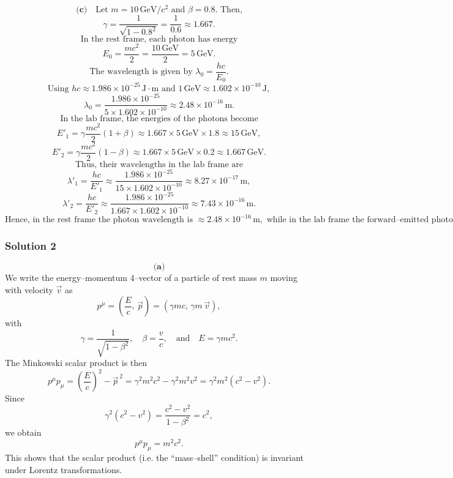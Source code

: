 \documentclass{article}
\begin{document}
\[
\textbf{(c)}\quad \text{Let } m = 10\,\text{GeV}/c^2 \text{ and } \beta=0.8. \text{ Then,}
\]
\[
\gamma = \frac{1}{\sqrt{1-0.8^2}} = \frac{1}{0.6} \approx 1.667.
\]
\[
\text{In the rest frame, each photon has energy}
\]
\[
E_0 = \frac{mc^2}{2} = \frac{10\,\text{GeV}}{2} = 5\,\text{GeV}.
\]
\[
\text{The wavelength is given by } \lambda_0 = \frac{hc}{E_0}.
\]
\[
\text{Using } hc \approx 1.986\times10^{-25}\,\text{J}\cdot\text{m} \text{ and } 1\,\text{GeV} \approx 1.602\times10^{-10}\,\text{J},
\]
\[
\lambda_0 = \frac{1.986\times10^{-25}}{5\times1.602\times10^{-10}} \approx 2.48\times10^{-16}\,\text{m}.
\]
\[
\text{In the lab frame, the energies of the photons become}
\]
\[
E'_1 = \gamma\frac{mc^2}{2}(1+\beta) \approx 1.667\times5\,\text{GeV}\times1.8 \approx 15\,\text{GeV},
\]
\[
E'_2 = \gamma\frac{mc^2}{2}(1-\beta) \approx 1.667\times5\,\text{GeV}\times0.2 \approx 1.667\,\text{GeV}.
\]
\[
\text{Thus, their wavelengths in the lab frame are}
\]
\[
\lambda'_1 = \frac{hc}{E'_1} \approx \frac{1.986\times10^{-25}}{15\times1.602\times10^{-10}} \approx 8.27\times10^{-17}\,\text{m},
\]
\[
\lambda'_2 = \frac{hc}{E'_2} \approx \frac{1.986\times10^{-25}}{1.667\times1.602\times10^{-10}} \approx 7.43\times10^{-16}\,\text{m}.
\]
\[
\text{Hence, in the rest frame the photon wavelength is } \approx 2.48\times10^{-16}\,\text{m}, \text{ while in the lab frame the forward–emitted photon has } \lambda'_1\approx 8.27\times10^{-17}\,\text{m} \text{ and the backward–emitted photon has } \lambda'_2\approx 7.43\times10^{-16}\,\text{m}.
\]

\subsubsection{Solution 2}
\[
\textbf{(a)}
\]
We write the energy–momentum 4–vector of a particle of rest mass \(m\) moving with velocity \(\vec{v}\) as
\[
p^\mu = \left(\frac{E}{c},\, \vec{p}\right) = \left(\gamma m c,\, \gamma m\, \vec{v}\right),
\]
with 
\[
\gamma = \frac{1}{\sqrt{1-\beta^2}}, \quad \beta = \frac{v}{c}, \quad \text{and} \quad E = \gamma m c^2.
\]
The Minkowski scalar product is then
\[
p^\mu p_\mu = \left(\frac{E}{c}\right)^2 - \vec{p}^{\,2} 
= \gamma^2 m^2 c^2 - \gamma^2 m^2 v^2 
= \gamma^2 m^2 (c^2-v^2).
\]
Since
\[
\gamma^2 (c^2-v^2)= \frac{c^2-v^2}{1-\beta^2} = c^2,
\]
we obtain
\[
p^\mu p_\mu = m^2 c^2.
\]
This shows that the scalar product (i.e. the “mass–shell” condition) is invariant under Lorentz transformations.

\vspace{5mm}
\end{document}
